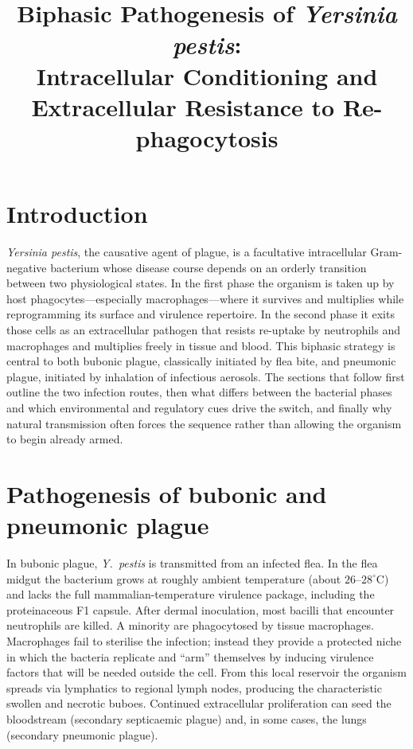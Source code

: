 \documentclass[11pt,a4paper]{article}
\title{Biphasic Pathogenesis of \textit{Yersinia pestis}:\\
Intracellular Conditioning and Extracellular Resistance to Re-phagocytosis}
\author{}
\date{}
\begin{document}
\maketitle
\thispagestyle{empty}

\section{Introduction}

\textit{Yersinia pestis}, the causative agent of plague, is a facultative intracellular Gram-negative bacterium whose disease course depends on an orderly transition between two physiological states. In the first phase the organism is taken up by host phagocytes---especially macrophages---where it survives and multiplies while reprogramming its surface and virulence repertoire. In the second phase it exits those cells as an extracellular pathogen that resists re-uptake by neutrophils and macrophages and multiplies freely in tissue and blood. This biphasic strategy is central to both bubonic plague, classically initiated by flea bite, and pneumonic plague, initiated by inhalation of infectious aerosols. The sections that follow first outline the two infection routes, then what differs between the bacterial phases and which environmental and regulatory cues drive the switch, and finally why natural transmission often forces the sequence rather than allowing the organism to begin already armed.

\section{Pathogenesis of bubonic and pneumonic plague}

In bubonic plague, \textit{Y.\ pestis} is transmitted from an infected flea. In the flea midgut the bacterium grows at roughly ambient temperature (about $26$--$28^\circ\mathrm{C}$) and lacks the full mammalian-temperature virulence package, including the proteinaceous F1 capsule. After dermal inoculation, most bacilli that encounter neutrophils are killed. A minority are phagocytosed by tissue macrophages. Macrophages fail to sterilise the infection; instead they provide a protected niche in which the bacteria replicate and ``arm'' themselves by inducing virulence factors that will be needed outside the cell. From this local reservoir the organism spreads via lymphatics to regional lymph nodes, producing the characteristic swollen and necrotic buboes. Continued extracellular proliferation can seed the bloodstream (secondary septicaemic plague) and, in some cases, the lungs (secondary pneumonic plague).
\end{document}
